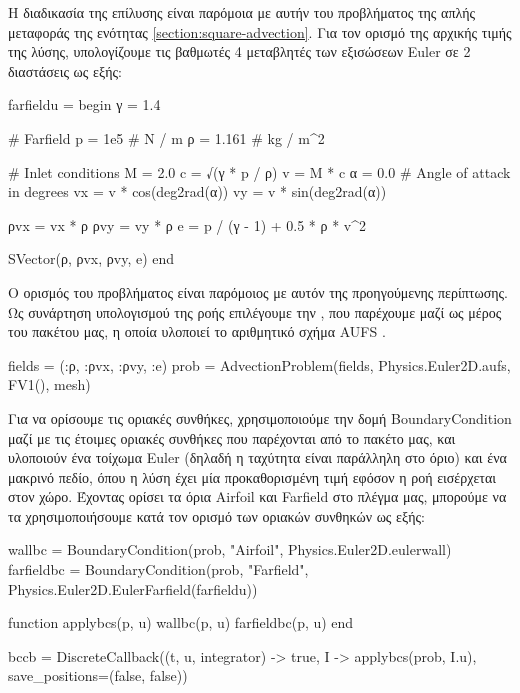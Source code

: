 Η διαδικασία της επίλυσης είναι παρόμοια με αυτήν του προβλήματος της απλής μεταφοράς της ενότητας \ref{section:square-advection}.
Για τον ορισμό της αρχικής τιμής της λύσης, υπολογίζουμε τις βαθμωτές 4 μεταβλητές των εξισώσεων Euler σε 2 διαστάσεις ως εξής:

{\large
\begin{jllisting}[language=julia,style=jlcodestyle]
farfieldu = begin
    γ = 1.4
	
    # Farfield
    p = 1e5 # N / m
    ρ = 1.161 # kg / m^2

    # Inlet conditions
	M = 2.0
	c = √(γ * p / ρ)
    v = M * c
    α = 0.0 # Angle of attack in degrees
    vx = v * cos(deg2rad(α))
    vy = v * sin(deg2rad(α))

    ρvx = vx * ρ
    ρvy = vy * ρ
    e = p / (γ - 1) + 0.5 * ρ * v^2
	
	SVector(ρ, ρvx, ρvy, e)
end
\end{jllisting}
}

Ο ορισμός του προβλήματος είναι παρόμοιος με αυτόν της προηγούμενης περίπτωσης.
Ως συνάρτηση υπολογισμού της ροής επιλέγουμε την , που παρέχουμε μαζί ως μέρος του πακέτου μας, η οποία υλοποιεί το αριθμητικό σχήμα AUFS \cite{Sun2003}.

{\large
\begin{jllisting}[language=julia,style=jlcodestyle]
fields = (:ρ, :ρvx, :ρvy, :e)
prob = AdvectionProblem(fields, Physics.Euler2D.aufs, FV1(), mesh)
\end{jllisting}
}

Για να ορίσουμε τις οριακές συνθήκες, χρησιμοποιούμε την δομή BoundaryCondition μαζί με τις έτοιμες οριακές συνθήκες που παρέχονται από το πακέτο μας, και υλοποιούν ένα τοίχωμα Euler (δηλαδή η ταχύτητα είναι παράλληλη στο όριο) και ένα μακρινό πεδίο, όπου η λύση έχει μία προκαθορισμένη τιμή εφόσον η ροή εισέρχεται στον χώρο.
Έχοντας ορίσει τα όρια Airfoil και Farfield στο πλέγμα μας, μπορούμε να τα χρησιμοποιήσουμε κατά τον ορισμό των οριακών συνθηκών ως εξής:

{\large
\begin{jllisting}[language=julia,style=jlcodestyle]
wallbc = BoundaryCondition(prob, "Airfoil", Physics.Euler2D.eulerwall)
farfieldbc = BoundaryCondition(prob, "Farfield", Physics.Euler2D.EulerFarfield(farfieldu))

function applybcs(p, u)
    wallbc(p, u)
    farfieldbc(p, u)
end

bccb = DiscreteCallback((t, u, integrator) -> true, I -> applybcs(prob, I.u), save_positions=(false, false))
\end{jllisting}
}

